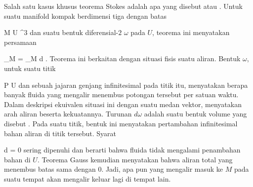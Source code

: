 {

Salah satu kasus khusus
teorema Stokes
adalah apa yang disebut  {} atau  {.} Untuk suatu manifold kompak berdimensi tiga dengan batas

\mavergleichskette
{\vergleichskette
{ M
}
{ \subset }{ U
}
{ \subseteq }{ \R^3
}
{    }{
}
{   }{
}
}
{}{}{}
 {} {}
dan suatu bentuk diferensial-$2$ $\omega$ pada $U$, teorema ini menyatakan persamaan

\mavergleichskettedisp
{\vergleichskette
{ \int_{\partial M} \omega
}
{ =} { \int_M d \omega
}
{ } {
}
{ } {
}
{ } {
}
}
{}{}{.}
Teorema ini berkaitan dengan situasi fisis suatu aliran. Bentuk $\omega$, untuk suatu titik

\mavergleichskette
{\vergleichskette
{ P
}
{ \in }{ U
}
{  }{
}
{    }{
}
{   }{
}
}
{}{}{}
dan sebuah jajaran genjang infinitesimal pada titik itu, menyatakan berapa banyak fluida yang mengalir menembus potongan tersebut per satuan waktu. Dalam deskripsi ekuivalen situasi ini dengan suatu medan vektor,
 menyatakan arah aliran beserta kekuatannya. Turunan $d \omega$ adalah suatu bentuk volume yang disebut  {.} Pada suatu titik, bentuk ini menyatakan pertambahan infinitesimal bahan aliran
 {} {}
di titik tersebut. Syarat

\mavergleichskette
{\vergleichskette
{d \omega
}
{ = }{ 0
}
{  }{
}
{    }{
}
{   }{
}
}
{}{}{}
sering dipenuhi dan berarti bahwa fluida tidak mengalami penambahan bahan di $U$. Teorema Gauss kemudian menyatakan bahwa aliran total yang menembus batas
 {} {}
sama dengan $0$. Jadi, apa pun yang mengalir masuk ke $M$ pada suatu tempat akan mengalir keluar lagi di tempat lain.

}




